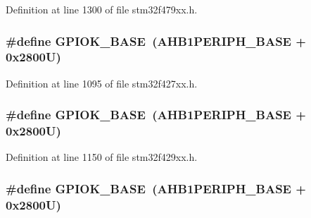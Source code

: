Definition at line 1300 of file stm32f479xx.\+h.

\subsubsection[{\texorpdfstring{G\+P\+I\+O\+K\+\_\+\+B\+A\+SE}{GPIOK_BASE}}]{\setlength{\rightskip}{0pt plus 5cm}\#define G\+P\+I\+O\+K\+\_\+\+B\+A\+SE~({\bf A\+H\+B1\+P\+E\+R\+I\+P\+H\+\_\+\+B\+A\+SE} + 0x2800\+U)}\hypertarget{group___peripheral__memory__map_ga46d3f8cd7c045b5e13cd7395b8e936e5}{}\label{group___peripheral__memory__map_ga46d3f8cd7c045b5e13cd7395b8e936e5}


Definition at line 1095 of file stm32f427xx.\+h.

\subsubsection[{\texorpdfstring{G\+P\+I\+O\+K\+\_\+\+B\+A\+SE}{GPIOK_BASE}}]{\setlength{\rightskip}{0pt plus 5cm}\#define G\+P\+I\+O\+K\+\_\+\+B\+A\+SE~({\bf A\+H\+B1\+P\+E\+R\+I\+P\+H\+\_\+\+B\+A\+SE} + 0x2800\+U)}\hypertarget{group___peripheral__memory__map_ga46d3f8cd7c045b5e13cd7395b8e936e5}{}\label{group___peripheral__memory__map_ga46d3f8cd7c045b5e13cd7395b8e936e5}


Definition at line 1150 of file stm32f429xx.\+h.

\subsubsection[{\texorpdfstring{G\+P\+I\+O\+K\+\_\+\+B\+A\+SE}{GPIOK_BASE}}]{\setlength{\rightskip}{0pt plus 5cm}\#define G\+P\+I\+O\+K\+\_\+\+B\+A\+SE~({\bf A\+H\+B1\+P\+E\+R\+I\+P\+H\+\_\+\+B\+A\+SE} + 0x2800\+U)}\hypertarget{group___peripheral__memory__map_ga46d3f8cd7c045b5e13cd7395b8e936e5}{}\label{group___peripheral__memory__map_ga46d3f8cd7c045b5e13cd7395b8e936e5}


